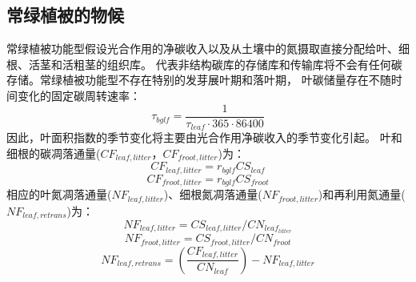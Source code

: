 \subsection{常绿植被的物候}\label{常绿植被的物候}
常绿植被功能型假设光合作用的净碳收入以及从土壤中的氮摄取直接分配给叶、细根、活茎和活粗茎的组织库。
代表非结构碳库的存储库和传输库将不会有任何碳存储。常绿植被功能型不存在特别的发芽展叶期和落叶期，
叶碳储量存在不随时间变化的固定碳周转速率：
\begin{equation}
\tau_{bglf}=\frac{1}{\tau_{leaf} \cdot 365 \cdot 86400}
\end{equation}
因此，叶面积指数的季节变化将主要由光合作用净碳收入的季节变化引起。
叶和细根的碳凋落通量($CF_{leaf,litter}$，$CF_{froot,litter}$)为：
\begin{equation}
CF_{leaf,litter}=r_{bglf} CS_{leaf}
\end{equation}
\begin{equation}
CF_{froot,litter}=r_{bglf} CS_{froot}
\end{equation}
相应的叶氮凋落通量($NF_{leaf,litter}$)、细根氮凋落通量($NF_{froot,litter}$)和再利用氮通量($NF_{leaf,retrans}$)为：
\begin{equation}
N F_{leaf,litter}=CS_{leaf,litter} / CN_{leaf_{litter}}
\end{equation}
\begin{equation}
N F_{froot,litter}=CS_{froot,litter} / CN_{froot}
\end{equation}
\begin{equation}
N F_{leaf,retrans}=\left(\frac{CF_{leaf,litter }}{CN_{leaf}}\right)-N F_{leaf,litter}
\end{equation}



